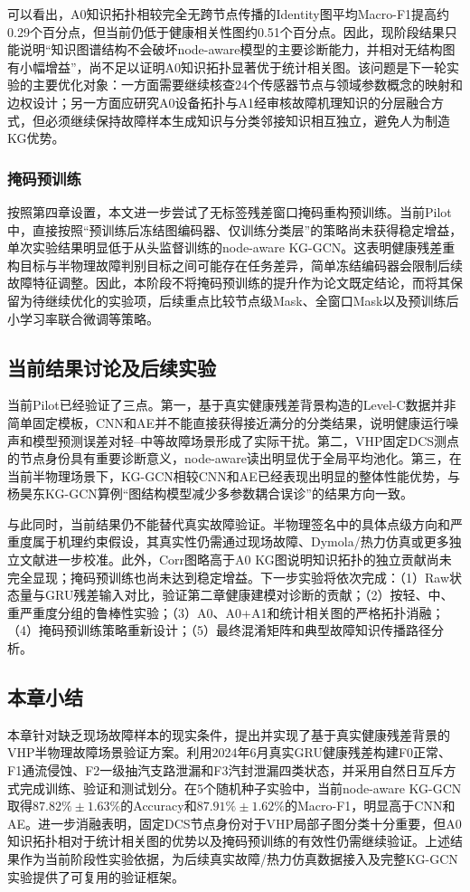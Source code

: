 可以看出，A0知识拓扑相较完全无跨节点传播的Identity图平均Macro-F1提高约0.29个百分点，但当前仍低于健康相关性图约0.51个百分点。因此，现阶段结果只能说明“知识图谱结构不会破坏node-aware模型的主要诊断能力，并相对无结构图有小幅增益”，尚不足以证明A0知识拓扑显著优于统计相关图。该问题是下一轮实验的主要优化对象：一方面需要继续核查24个传感器节点与领域参数概念的映射和边权设计；另一方面应研究A0设备拓扑与A1经审核故障机理知识的分层融合方式，但必须继续保持故障样本生成知识与分类邻接知识相互独立，避免人为制造KG优势。

\subsubsection{掩码预训练}

按照第四章设置，本文进一步尝试了无标签残差窗口掩码重构预训练。当前Pilot中，直接按照“预训练后冻结图编码器、仅训练分类层”的策略尚未获得稳定增益，单次实验结果明显低于从头监督训练的node-aware KG-GCN。这表明健康残差重构目标与半物理故障判别目标之间可能存在任务差异，简单冻结编码器会限制后续故障特征调整。因此，本阶段不将掩码预训练的提升作为论文既定结论，而将其保留为待继续优化的实验项，后续重点比较节点级Mask、全窗口Mask以及预训练后小学习率联合微调等策略。

\subsection{当前结果讨论及后续实验}

当前Pilot已经验证了三点。第一，基于真实健康残差背景构造的Level-C数据并非简单固定模板，CNN和AE并不能直接获得接近满分的分类结果，说明健康运行噪声和模型预测误差对轻--中等故障场景形成了实际干扰。第二，VHP固定DCS测点的节点身份具有重要诊断意义，node-aware读出明显优于全局平均池化。第三，在当前半物理场景下，KG-GCN相较CNN和AE已经表现出明显的整体性能优势，与杨昊东KG-GCN算例“图结构模型减少多参数耦合误诊”的结果方向一致\cite{YangHaodong2026CFB}。

与此同时，当前结果仍不能替代真实故障验证。半物理签名中的具体点级方向和严重度属于机理约束假设，其真实性仍需通过现场故障、Dymola/热力仿真或更多独立文献进一步校准。此外，Corr图略高于A0 KG图说明知识拓扑的独立贡献尚未完全显现；掩码预训练也尚未达到稳定增益。下一步实验将依次完成：（1）Raw状态量与GRU残差输入对比，验证第二章健康建模对诊断的贡献；（2）按轻、中、重严重度分组的鲁棒性实验；（3）A0、A0+A1和统计相关图的严格拓扑消融；（4）掩码预训练策略重新设计；（5）最终混淆矩阵和典型故障知识传播路径分析。

\subsection{本章小结}

本章针对缺乏现场故障样本的现实条件，提出并实现了基于真实健康残差背景的VHP半物理故障场景验证方案。利用2024年6月真实GRU健康残差构建F0正常、F1通流侵蚀、F2一级抽汽支路泄漏和F3汽封泄漏四类状态，并采用自然日互斥方式完成训练、验证和测试划分。在5个随机种子实验中，当前node-aware KG-GCN取得$87.82\%\pm1.63\%$的Accuracy和$87.91\%\pm1.62\%$的Macro-F1，明显高于CNN和AE。进一步消融表明，固定DCS节点身份对于VHP局部子图分类十分重要，但A0知识拓扑相对于统计相关图的优势以及掩码预训练的有效性仍需继续验证。上述结果作为当前阶段性实验依据，为后续真实故障/热力仿真数据接入及完整KG-GCN实验提供了可复用的验证框架。